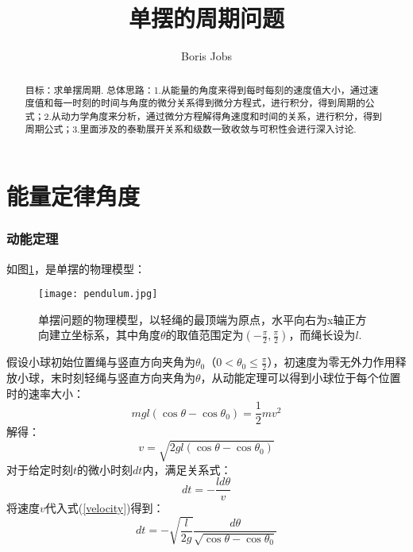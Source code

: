 \documentclass{jams-l}
\theoremstyle{definition}
\theoremstyle{remark}
\numberwithin{equation}{section}
\begin{document}
\title{单摆的周期问题}
\author{Boris Jobs}






\maketitle
\begin{abstract}
目标：求单摆周期. 总体思路：1.从能量的角度来得到每时每刻的速度值大小，通过速度值和每一时刻的时间与角度的微分关系得到微分方程式，进行积分，得到周期的公式；2.从动力学角度来分析，通过微分方程解得角速度和时间的关系，进行积分，得到周期公式；3.里面涉及的泰勒展开关系和级数一致收敛与可积性会进行深入讨论.
\end{abstract}
\tableofcontents




\newpage
\part{能量定律角度}
\section{动能定理}
如图\ref{question}，是单摆的物理模型：
\begin{figure}
    \centering
    \texttt{[image: pendulum.jpg]}
    \caption{单摆问题的物理模型，以轻绳的最顶端为原点，水平向右为x轴正方向建立坐标系，其中角度$\theta$的取值范围定为$(-\frac{\pi}{2}, \frac{\pi}{2})$，而绳长设为$l$.}
    \label{question}
\end{figure}
假设小球初始位置绳与竖直方向夹角为$\theta_0$（$0<\theta_0 \leq \frac{\pi}{2}$），初速度为零无外力作用释放小球，末时刻轻绳与竖直方向夹角为$\theta$，从动能定理可以得到小球位于每个位置时的速率大小：
\begin{equation}
    mgl(\cos\theta-\cos\theta_0)=\frac{1}{2} mv^2
\end{equation}
解得：
\begin{equation}
    v=\sqrt{2gl(\cos\theta-\cos\theta_0)}
\end{equation}
对于给定时刻$t$的微小时刻$dt$内，满足关系式：
\begin{equation}\label{velocity}
    dt=-\frac{ld\theta}{v}
\end{equation}
将速度$v$代入式(\ref{velocity})得到：
\begin{equation}\label{dt}
    dt=-\sqrt{\frac{l}{2g}}\frac{d\theta}{\sqrt{\cos\theta-\cos\theta_0}}
\end{equation}
\end{document}
